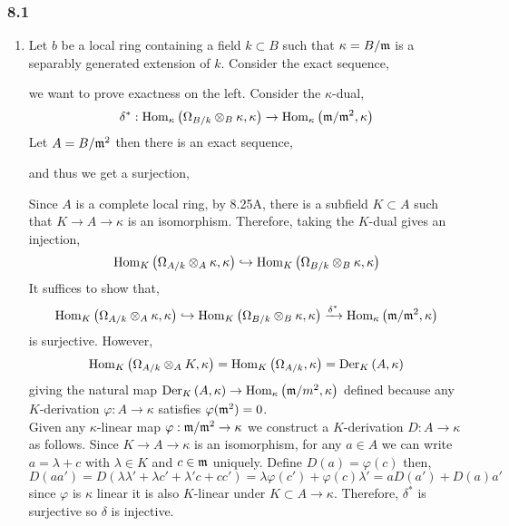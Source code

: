\documentclass[12pt]{article}
\begin{document}
\subsubsection{8.1}

\begin{enumerate}
\item Let $b$ be a local ring containing a field $k \subset B$ such that $\kappa = B / \mathfrak{m}$ is a separably generated extension of $k$. Consider the exact sequence,
\begin{center}
\end{center}
we want to prove exactness on the left.
Consider the $\kappa$-dual,
\[ \delta^* : \mathrm{Hom}_{\kappa} \left( \Omega_{B/k} \otimes_B \kappa, \kappa \right) \to \mathrm{Hom}_{\kappa} \left( \mathfrak{m}/\mathfrak{m}^2, \kappa \right) \]
Let $A = B / \mathfrak{m}^2$ then there is an exact sequence,
\begin{center}
\end{center}
and thus we get a surjection,
\begin{center}
\end{center}
Since $A$ is a complete local ring, by 8.25A, there is a subfield $K \subset A$ such that $K \to A \to \kappa$ is an isomorphism. Therefore, taking the $K$-dual gives an injection,
\[ \mathrm{Hom}_{K} \left( \Omega_{A/k} \otimes_A \kappa, \kappa \right) \hookrightarrow \mathrm{Hom}_{K} \left( \Omega_{B/k} \otimes_B \kappa , \kappa \right) \]
It suffices to show that,
\[ \mathrm{Hom}_{K} \left( \Omega_{A/k} \otimes_A \kappa, \kappa \right) \hookrightarrow \mathrm{Hom}_{K} \left( \Omega_{B/k} \otimes_B \kappa , \kappa \right) \xrightarrow{\delta^*} \mathrm{Hom}_{\kappa} \left( \mathfrak{m}/\mathfrak{m}^2, \kappa \right) \]
is surjective. However,
\[ \mathrm{Hom}_{K} \left( \Omega_{A/k} \otimes_A K, \kappa \right) = \mathrm{Hom}_{K} \left( \Omega_{A/k}, \kappa \right) = \mathrm{Der}_{K} \left( A, \kappa \right) \]
giving the natural map $\mathrm{Der}_{K} \left( A, \kappa \right) \to \mathrm{Hom}_{\kappa} \left( \mathfrak{m}/m^2, \kappa \right)$ defined because any $K$-derivation $\varphi : A \to \kappa$ satisfies $\varphi(\mathfrak{m}^2) = 0$.
\bigskip\\
Given any $\kappa$-linear map $\varphi : \mathfrak{m} / \mathfrak{m}^2 \to \kappa$ we construct a $K$-derivation $D : A \to \kappa$ as follows. Since $K \to A \to \kappa$ is an isomorphism, for any $a \in A$ we can write $a = \lambda + c$ with $\lambda \in K$ and $c \in \mathfrak{m}$ uniquely. Define $D(a) = \varphi(c)$ then,
\[ D(aa') = D(\lambda \lambda' + \lambda c' + \lambda' c + c c') = \lambda \varphi(c') + \varphi(c) \lambda' = a D(a') + D(a) a' \]
since $\varphi$ is $\kappa$ linear it is also $K$-linear under $K \subset A \to \kappa$. Therefore, $\delta^*$ is surjective so $\delta$ is injective.


\end{enumerate}
\end{document}
